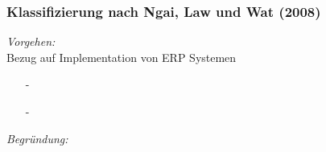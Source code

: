 \noindent
\subsubsection{Klassifizierung nach Ngai, Law und Wat (2008)}
\textit{Vorgehen:}\\\noindent
Bezug auf Implementation von ERP Systemen
\begin{itemize}\itemsep0pt
\item[-]
\item[-]
\end{itemize}

\textit{Begründung:}\\\noindent